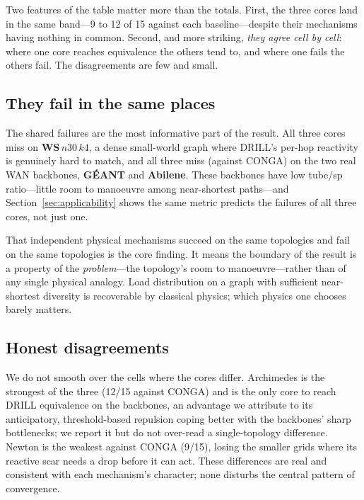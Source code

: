 Two features of the table matter more than the totals. First, the three cores
land in the same band---9 to 12 of 15 against each baseline---despite their
mechanisms having nothing in common. Second, and more striking, \emph{they agree
cell by cell}: where one core reaches equivalence the others tend to, and where
one fails the others fail. The disagreements are few and small.

\subsection{They fail in the same places}

The shared failures are the most informative part of the result. All three cores
miss on \textbf{WS\,$n30\,k4$}, a dense small-world graph where DRILL's per-hop
reactivity is genuinely hard to match, and all three miss (against CONGA) on the
two real WAN backbones, \textbf{G\'EANT} and \textbf{Abilene}. These backbones
have low tube/sp ratio---little room to manoeuvre among near-shortest
paths---and Section~\ref{sec:applicability} shows the same metric predicts the
failures of all three cores, not just one.

That independent physical mechanisms succeed on the same topologies and fail on
the same topologies is the core finding. It means the boundary of the result is
a property of the \emph{problem}---the topology's room to manoeuvre---rather than
of any single physical analogy. Load distribution on a graph with sufficient
near-shortest diversity is recoverable by classical physics; which physics one
chooses barely matters.

\subsection{Honest disagreements}

We do not smooth over the cells where the cores differ. Archimedes is the
strongest of the three (12/15 against CONGA) and is the only core to reach DRILL
equivalence on the backbones, an advantage we attribute to its anticipatory,
threshold-based repulsion coping better with the backbones' sharp bottlenecks;
we report it but do not over-read a single-topology difference. Newton is the
weakest against CONGA (9/15), losing the smaller grids where its reactive scar
needs a drop before it can act. These differences are real and consistent with
each mechanism's character; none disturbs the central pattern of convergence.
